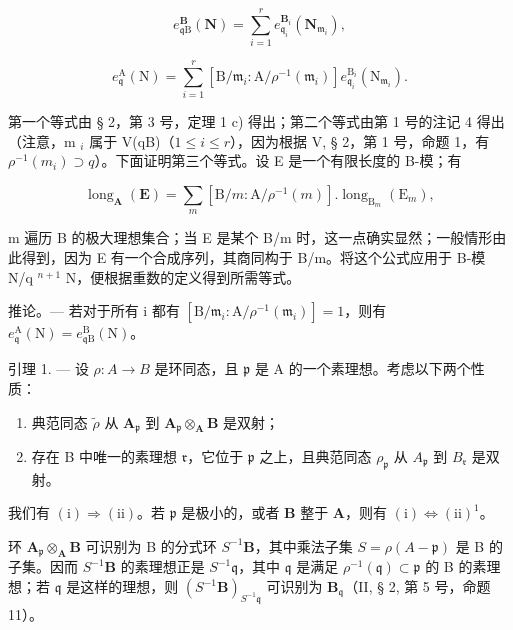 \[
e _ {\mathfrak {q} \mathrm{B}} ^ {\mathbf {B}} (\mathbf {N}) = \sum_ {i = 1} ^ {r} e _ {\mathfrak {q} _ {i}} ^ {\mathbf {B} _ {i}} (\mathbf {N} _ {\mathfrak {m} _ {i}}),
\]

\[
e _ {\mathfrak {q}} ^ {\mathrm{A}} (\mathrm{N}) = \sum_ {i = 1} ^ {r} \left[ \mathrm{B} / \mathfrak {m} _ {i}: \mathrm{A} / \rho^ {- 1} (\mathfrak {m} _ {i}) \right] e _ {\mathfrak {q} _ {i}} ^ {\mathrm{B} _ {i}} (\mathrm{N} _ {\mathfrak {m} _ {i}}).
\]

第一个等式由 § 2，第 3 号，定理 1 c) 得出；第二个等式由第 1 号的注记 4 得出（注意，m \(_{i}\) 属于 V(qB)（\(1 \leqslant i \leqslant r\)），因为根据 V, § 2，第 1 号，命题 1，有 \(\rho^{-1}(m_{i}) \supset q\)）。下面证明第三个等式。设 E 是一个有限长度的 B-模；有

\[
\operatorname{long} _ {\mathbf {A}} (\mathbf {E}) = \sum_ {m} \left[ \mathrm{B} / m: \mathrm{A} / \rho^ {- 1} (m) \right]. \operatorname{long} _ {\mathrm{B} _ {m}} \left(\mathrm{E} _ {m}\right),
\]

m 遍历 B 的极大理想集合；当 E 是某个 B/m 时，这一点确实显然；一般情形由此得到，因为 E 有一个合成序列，其商同构于 B/m。将这个公式应用于 B-模 N/q \(^{n+1}\) N，便根据重数的定义得到所需等式。

推论。— 若对于所有 i 都有 \(\left[\mathrm{B}/\mathfrak{m}_{i}:\mathrm{A}/\rho^{-1}(\mathfrak{m}_{i})\right]=1\)，则有 \(e_{\mathfrak{q}}^{\mathrm{A}}(\mathrm{N})=e_{\mathfrak{q}\mathrm{B}}^{\mathrm{B}}(\mathrm{N})\)。

引理 1. — 设 \(\rho: A \to B\) 是环同态，且 \(\mathfrak{p}\) 是 A 的一个素理想。考虑以下两个性质：

\begin{enumerate}
\def\labelenumi{(\roman{enumi})}
\item
  典范同态 \(\tilde{\rho}\) 从 \(\mathbf{A}_{\mathfrak{p}}\) 到 \(\mathbf{A}_{\mathfrak{p}} \otimes_{\mathbf{A}} \mathbf{B}\) 是双射；
\item
  存在 B 中唯一的素理想 \(\mathfrak{r}\)，它位于 \(\mathfrak{p}\) 之上，且典范同态 \(\rho_{\mathfrak{p}}\) 从 \(A_{\mathfrak{p}}\) 到 \(B_{\mathfrak{r}}\) 是双射。
\end{enumerate}

我们有 \((\mathrm{i}) \Rightarrow (\mathrm{ii})\)。若 \(\mathfrak{p}\) 是极小的，或者 \(\mathbf{B}\) 整于 \(\mathbf{A}\)，则有 \((\mathrm{i}) \Leftrightarrow (\mathrm{ii})^{1}\)。

环 \(\mathbf{A}_{\mathfrak{p}} \otimes_{\mathbf{A}} \mathbf{B}\) 可识别为 B 的分式环 \(S^{-1} \mathbf{B}\)，其中乘法子集 \(S = \rho(A - \mathfrak{p})\) 是 B 的子集。因而 \(S^{-1} \mathbf{B}\) 的素理想正是 \(S^{-1} \mathfrak{q}\)，其中 \(\mathfrak{q}\) 是满足 \(\rho^{-1}(\mathfrak{q}) \subset \mathfrak{p}\) 的 B 的素理想；若 \(\mathfrak{q}\) 是这样的理想，则 \((S^{-1} \mathbf{B})_{S^{-1} \mathfrak{q}}\) 可识别为 \(\mathbf{B}_{\mathfrak{q}}\)（II, § 2, 第 5 号，命题 11）。

